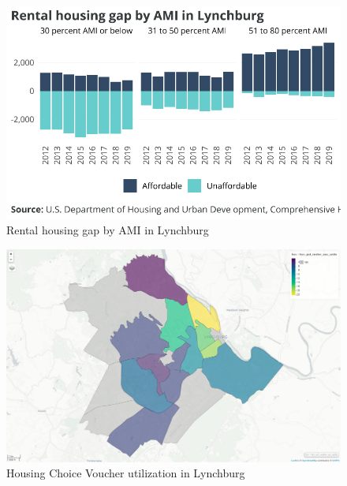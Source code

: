 \documentclass[
  letterpaper,
  DIV=11,
  numbers=noendperiod]{scrreprt}
\begin{document}
\begin{figure}[H]

{\centering \includegraphics{./part-3-3_files/figure-pdf/fig-gap-1.pdf}

}

\caption{\label{fig-gap}Rental housing gap by AMI in Lynchburg}

\end{figure}

\begin{figure}[H]

{\centering \includegraphics{./part-3-3_files/figure-pdf/fig-hcv-map-1.pdf}

}

\caption{\label{fig-hcv-map}Housing Choice Voucher utilization in
Lynchburg}

\end{figure}
\end{document}
